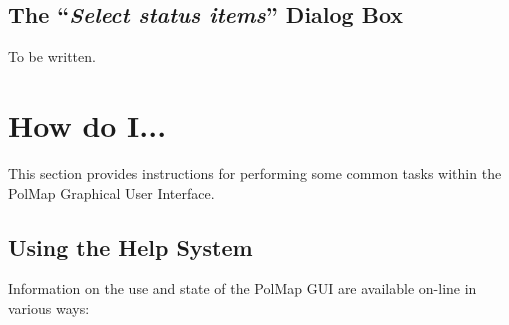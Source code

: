 \subsection {The ``{\em Select status items}'' Dialog Box}
To be written.

\section {How do I...}
This section provides instructions for performing some common tasks
within the PolMap Graphical User Interface.

\subsection {Using the Help System}
Information on the use and state of the PolMap GUI are available on-line
in various ways:

